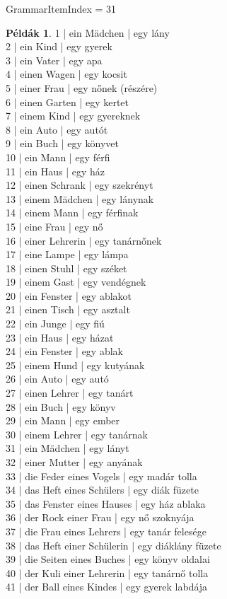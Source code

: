 \documentclass{article}
\theoremstyle{definition}
\newtheorem*{exmp}{Példák}
\begin{document}
GrammarItemIndex = 31

\begin{exmp}
1 | ein Mädchen | egy lány\\
2 | ein Kind | egy gyerek\\
3 | ein Vater | egy apa\\
4 | einen Wagen | egy kocsit\\
5 | einer Frau | egy nőnek (részére)\\
6 | einen Garten | egy kertet\\
7 | einem Kind | egy gyereknek\\
8 | ein Auto | egy autót\\
9 | ein Buch | egy könyvet\\
10 | ein Mann | egy férfi\\
11 | ein Haus | egy ház\\
12 | einen Schrank | egy szekrényt\\
13 | einem Mädchen | egy lánynak\\
14 | einem Mann | egy férfinak\\
15 | eine Frau | egy nő\\
16 | einer Lehrerin | egy tanárnőnek\\
17 | eine Lampe | egy lámpa\\
18 | einen Stuhl | egy széket\\
19 | einem Gast | egy vendégnek\\
20 | ein Fenster | egy ablakot\\
21 | einen Tisch | egy asztalt\\
22 | ein Junge | egy fiú\\
23 | ein Haus | egy házat\\
24 | ein Fenster | egy ablak\\
25 | einem Hund | egy kutyának\\
26 | ein Auto | egy autó\\
27 | einen Lehrer | egy tanárt\\
28 | ein Buch | egy könyv\\
29 | ein Mann | egy ember\\
30 | einem Lehrer | egy tanárnak\\
31 | ein Mädchen | egy lányt\\
32 | einer Mutter | egy anyának\\
33 | die Feder eines Vogels | egy madár tolla\\
34 | das Heft eines Schülers | egy diák füzete\\
35 | das Fenster eines Hauses | egy ház ablaka\\
36 | der Rock einer Frau | egy nő szoknyája\\
37 | die Frau eines Lehrers | egy tanár felesége\\
38 | das Heft einer Schülerin | egy diáklány füzete\\
39 | die Seiten eines Buches | egy könyv oldalai\\
40 | der Kuli einer Lehrerin | egy tanárnő tolla\\
41 | der Ball eines Kindes | egy gyerek labdája\\
\end{exmp}
\end{document}
